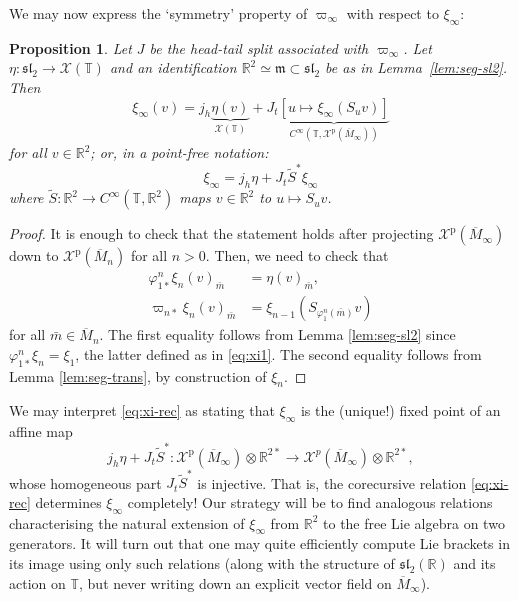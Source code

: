 \documentclass{article}
\def\fsl{\mathfrak{sl}}
\def\fm{\mathfrak{m}}
\def\RR{\mathbb{R}}
\def\TT{\mathbb{T}}
\def\XX{\mathscr{X}}
\def\p{\mathrm{p}}
\newtheorem{prop}{Proposition}
\theoremstyle{definition}
\begin{document}
We
may now express the `symmetry' property of $\varpi_\infty$ with respect to $\xi_\infty$:
\begin{prop}\label{prop:xi-rec}
        Let $J$ be the head-tail split associated
        with $\varpi_\infty$. Let $\eta : \fsl_2 \to \XX(\TT)$
        and an identification $\RR^2 \simeq \fm \subset \fsl_2$ be as in Lemma~\ref{lem:seg-sl2}.
        Then 
        $$
        \xi_\infty(v) = j_h \underbrace{ \eta(v) }_{\XX(\TT)} 
        + J_t\underbrace{
        \left[ u \mapsto \xi_\infty(S_u v) \right]
        }_{C^\infty(\TT, \XX^\p(\overline M_\infty))} 
        $$
        for all $v \in \RR^2$; or, in a point-free notation:
\begin{equation}\label{eq:xi-rec}
         \xi_\infty = j_h\eta + J_t \tilde S^* \xi_\infty
\end{equation}
        where $\tilde S  : \RR^2 \to C^\infty(\TT, \RR^2)$
        maps $v \in \RR^2$ to $u\mapsto S_uv$.
\end{prop}
\begin{proof}
        It is enough to check that the statement holds after
        projecting $\XX^\p(\overline M_\infty)$ down to $\XX^\p(\overline M_n)$
        for all $n>0$. Then, we need to check that
        \begin{align*}
                \varphi^n_{1*}\xi_n(v)_{\bar m} &= \eta(v)_{\bar m},\\
                \varpi_{n*}\xi_n(v)_{\bar m} &= \xi_{n-1}(S_{\varphi^n_1(\bar m)} v)
        \end{align*}
        for all $\bar m \in \overline M_n$. The first equality follows from Lemma \ref{lem:seg-sl2}
        since $\varphi^n_{1*}\xi_n = \xi_1$, the latter defined as in \eqref{eq:xi1}. The
        second equality follows from Lemma \ref{lem:seg-trans}, by construction of $\xi_n$.
\end{proof}

We may interpret \eqref{eq:xi-rec} as stating that $\xi_\infty$ is the (unique!) fixed point of an affine
map
$$
 j_h\eta + J_t\tilde S^* :
\XX^\p(\overline M_\infty)\otimes\RR^{2*} \to
\XX^p(\overline M_\infty)\otimes\RR^{2*}, $$
whose homogeneous part $J_t \tilde S^*$
is injective. That is, the corecursive relation \eqref{eq:xi-rec} determines
$\xi_\infty$ completely!
Our strategy will be to find analogous relations
characterising the natural extension of $\xi_\infty$
from $\RR^2$ to the free Lie algebra on two generators.
It will turn out that one may quite efficiently compute Lie brackets in its image using only such 
relations (along with the structure of $\fsl_2(\RR)$ and its action on $\TT$, but
never writing down an explicit vector field on $\overline M_\infty$).
\end{document}
